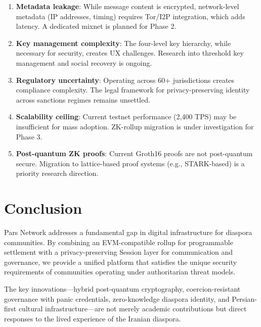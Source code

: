 \documentclass[11pt,a4paper]{article}
\begin{document}
\begin{enumerate}
    \item \textbf{Metadata leakage}: While message content is encrypted, network-level metadata (IP addresses, timing) requires Tor/I2P integration, which adds latency. A dedicated mixnet is planned for Phase 2.

    \item \textbf{Key management complexity}: The four-level key hierarchy, while necessary for security, creates UX challenges. Research into threshold key management and social recovery is ongoing.

    \item \textbf{Regulatory uncertainty}: Operating across 60+ jurisdictions creates compliance complexity. The legal framework for privacy-preserving identity across sanctions regimes remains unsettled.

    \item \textbf{Scalability ceiling}: Current testnet performance (2{,}400 TPS) may be insufficient for mass adoption. ZK-rollup migration is under investigation for Phase 3.

    \item \textbf{Post-quantum ZK proofs}: Current Groth16 proofs are not post-quantum secure. Migration to lattice-based proof systems (e.g., STARK-based) is a priority research direction.
\end{enumerate}

\section{Conclusion}
\label{sec:conclusion}

Pars Network addresses a fundamental gap in digital infrastructure for diaspora communities.
By combining an EVM-compatible rollup for programmable settlement with a privacy-preserving Session layer for communication and governance, we provide a unified platform that satisfies the unique security requirements of communities operating under authoritarian threat models.

The key innovations---hybrid post-quantum cryptography, coercion-resistant governance with panic credentials, zero-knowledge diaspora identity, and Persian-first cultural infrastructure---are not merely academic contributions but direct responses to the lived experience of the Iranian diaspora.
\end{document}
